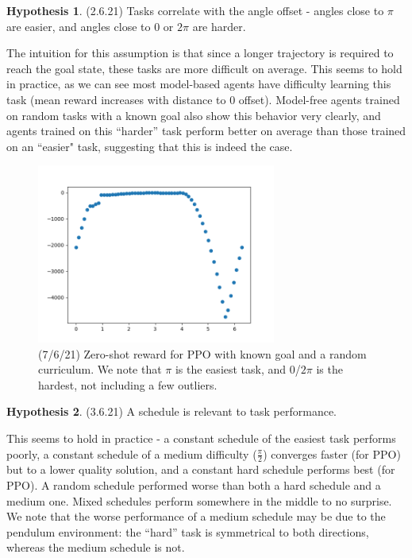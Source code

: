 \documentclass[letterpaper]{article}
\theoremstyle{definition}
\newtheorem{hypothesis}{Hypothesis}[section]
\begin{document}
\begin{hypothesis} (2.6.21)
	Tasks correlate with the angle offset - angles close to $\pi$ are easier, and angles close to $0$ or $2\pi$ are harder.
\end{hypothesis}
The intuition for this assumption is that since a longer trajectory is required to reach the goal state, these tasks are more difficult on average. This seems to hold in practice, as we can see most model-based agents have difficulty learning this task (mean reward increases with distance to $0$ offset). 
Model-free agents trained on random tasks with a known goal also show this behavior very clearly, and agents trained on this ``harder'' task perform better on average than those trained on an ``easier" task, suggesting that this is indeed the case. 

\begin{figure}[h]
	\includegraphics[width=0.7\textwidth]{pend-rand}
	\caption{(7/6/21) Zero-shot reward for PPO with known goal and a random curriculum. We note that $\pi$ is the easiest task, and $0$/$2\pi$ is the hardest, not including a few outliers.}
\end{figure}

\begin{hypothesis} (3.6.21)
	A schedule is relevant to task performance.
\end{hypothesis}
This seems to hold in practice - a constant schedule of the easiest task performs poorly, a constant schedule of a medium difficulty ($\frac{\pi}{2}$) converges faster (for PPO) but to a lower quality solution, and a constant hard schedule performs best (for PPO). A random schedule performed worse than both a hard schedule and a medium one.
Mixed schedules perform somewhere in the middle to no surprise.
We note that the worse performance of a medium schedule may be due to the pendulum environment: the ``hard'' task is symmetrical to both directions, whereas the medium schedule is not. 
\end{document}
